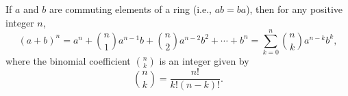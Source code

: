 If $a$ and $b$ are commuting elements of a ring (i.e., $ab = ba$), then for any positive integer $n$,
$$(a + b)^n = a^n + \binom{n}{1}a^{n-1}b + \binom{n}{2}a^{n-2}b^2 + \cdots + b^n = \sum_{k=0}^{n} \binom{n}{k} a^{n-k} b^k,$$
where the binomial coefficient $\binom{n}{k}$ is an integer given by
$$\binom{n}{k} = \frac{n!}{k!(n-k)!}.$$
